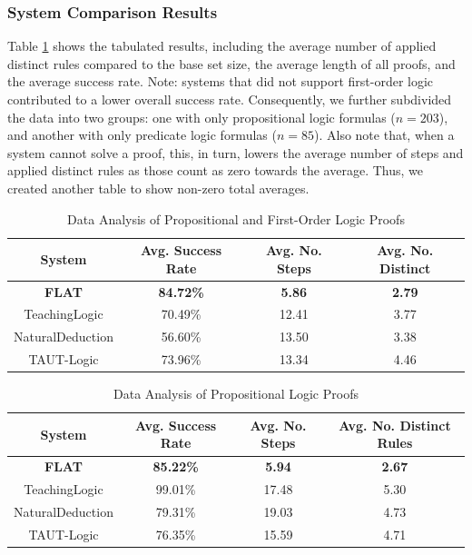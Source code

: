 \documentclass[ms]{uncgdissertationexp2}
\theoremstyle{plain}
\theoremstyle{definition}
\theoremstyle{remark}
\begin{document}
\subsubsection{System Comparison Results}
Table \ref{table:allData} shows the tabulated results, including the average number of applied distinct rules compared to the base set size, the average length of all proofs, and the average success rate. Note: systems that did not support first-order logic contributed to a lower overall success rate. Consequently, we further subdivided the data into two groups: one with only propositional logic formulas ($n=203$), and another with only predicate logic formulas ($n=85$). Also note that, when a system cannot solve a proof, this, in turn, lowers the average number of steps and applied distinct rules as those count as zero towards the average. Thus, we created another table to show non-zero total averages.
\begin{table}[!ht]
	\centering
	\caption{Data Analysis of Propositional and First-Order Logic Proofs}
	\begin{tabularx}{\textwidth}{*4c}
		\toprule
		System           & Avg. Success Rate & Avg. No. Steps & Avg. No. Distinct \\    
		\midrule
		\textbf{FLAT}    & \textbf{84.72\%}  & \textbf{5.86}  & \textbf{2.79}     \\
		TeachingLogic    & 70.49\%           & 12.41          & 3.77              \\
		NaturalDeduction & 56.60\%           & 13.50          & 3.38              \\
		TAUT-Logic       & 73.96\%           & 13.34          & 4.46              \\
		\bottomrule
	\end{tabularx}
	\label{table:allData}
\end{table}

\begin{table}[!ht]
	\centering
	\caption{Data Analysis of Propositional Logic Proofs}
	\begin{tabularx}{\textwidth}{*4c}
		\toprule
		System           & Avg. Success Rate & Avg. No. Steps & Avg. No. Distinct Rules \\    
		\midrule
		\textbf{FLAT}    & \textbf{85.22\%}  & \textbf{5.94}  & \textbf{2.67}           \\
		TeachingLogic    & 99.01\%           & 17.48          & 5.30                    \\
		NaturalDeduction & 79.31\%           & 19.03          & 4.73                    \\
		TAUT-Logic       & 76.35\%           & 15.59          & 4.71                    \\
		\bottomrule
	\end{tabularx}
	\label{table:propData}
\end{table}
\end{document}
